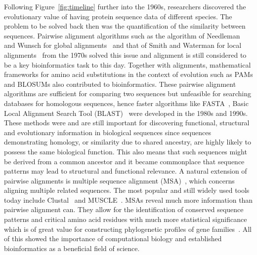 Following Figure~\ref{fig:timeline} further into the 1960s, researchers discovered the evolutionary value of having protein sequence data of different species. The problem to be solved back then was the quantification of the similarity between sequences. Pairwise alignment algorithms such as the algorithm of Needleman and Wunsch for global alignments~\cite{global} and that of Smith and Waterman for local alignments~\cite{local} from the 1970s solved this issue and alignment is still considered to be a key bioinformatics task to this day. Together with alignments, mathematical frameworks for amino acid substitutions in the context of evolution such as PAMs and BLOSUMs also contributed to bioinformatics. These pairwise alignment algorithms are sufficient for comparing two sequences but unfeasible for searching databases for homologous sequences, hence faster algorithms like FASTA~\cite{fasta}, Basic Local Alignment Search Tool (BLAST)~\cite{blast} were developed in the 1980s and 1990s. These methods were and are still important for discovering functional, structural and evolutionary information in biological sequences since sequences demonstrating homology, or similarity due to shared ancestry, are highly likely to possess the same biological function. This also means that such sequences might be derived from a common ancestor and it became commonplace that sequence patterns may lead to structural and functional relevance. A natural extension of pairwise alignments is multiple sequence alignment (MSA)~\cite{msa}, which concerns aligning multiple related sequences. The most popular and still widely used tools today include Clustal~\cite{clustal} and MUSCLE~\cite{muscle}. MSAs reveal much more information than pairwise alignment can. They allow for the identification of conserved sequence patterns and critical amino acid residues with much more statistical significance which is of great value for constructing phylogenetic profiles of gene families~\cite{phylo}. All of this showed the importance of computational biology and established bioinformatics as a beneficial field of science.

